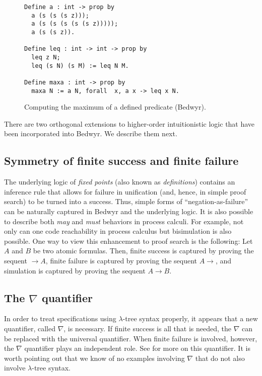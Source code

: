 \begin{figure}
\begin{verbatim}
Define a : int -> prop by
  a (s (s (s z)));
  a (s (s (s (s (s z)))));
  a (s (s z)).

Define leq : int -> int -> prop by
  leq z N;
  leq (s N) (s M) := leq N M.

Define maxa : int -> prop by
  maxa N := a N, forall  x, a x -> leq x N.
\end{verbatim}
\caption{Computing the maximum of a defined predicate (Bedwyr).}
\label{maxa-bdw}
\end{figure}

\bigskip
There are two orthogonal extensions to higher-order intuitionistic
logic that have been incorporated into Bedwyr.   We describe them next.

\subsection{Symmetry of finite success and finite failure}

The underlying logic of {\em fixed points} (also known as {\em
definitions})
\cite{girard92mail,schroeder-Heister93lics,mcdowell03tcs,momigliano03types}
contains an inference rule that allows for failure in unification
(and, hence, in simple proof search) to be turned into a success.
Thus, simple forms of ``negation-as-failure'' can be naturally
captured in Bedwyr and the underlying logic.  It is also possible to
describe both {\em may} and {\em must} behaviors in process calculi.
For example, not only can one code reachability in process calculus
but bisimulation is also possible.  One way to view this enhancement
to proof search is the following: Let $A$ and $B$ be two atomic
formulas.  Then, finite success is captured by proving the sequent
$\longrightarrow A$, finite failure is captured by proving the sequent
$A\longrightarrow$, and simulation is captured by proving the sequent
$A\longrightarrow B$.

\subsection{The \texorpdfstring{$\nabla$}{nabla} quantifier}

In order to treat specifications using $\lambda$-tree syntax
properly, it appears that a new quantifier, called $\nabla$, is
necessary.  If finite success is all that is needed, the $\nabla$ can
be replaced with the universal quantifier.  When finite failure is
involved, however, the $\nabla$ quantifier plays an independent role.
See \cite{miller05tocl,tiu04phd,tiu05concur} for more on this
quantifier.  It is worth pointing out that we know of no examples
involving $\nabla$ that do not also involve $\lambda$-tree syntax.


